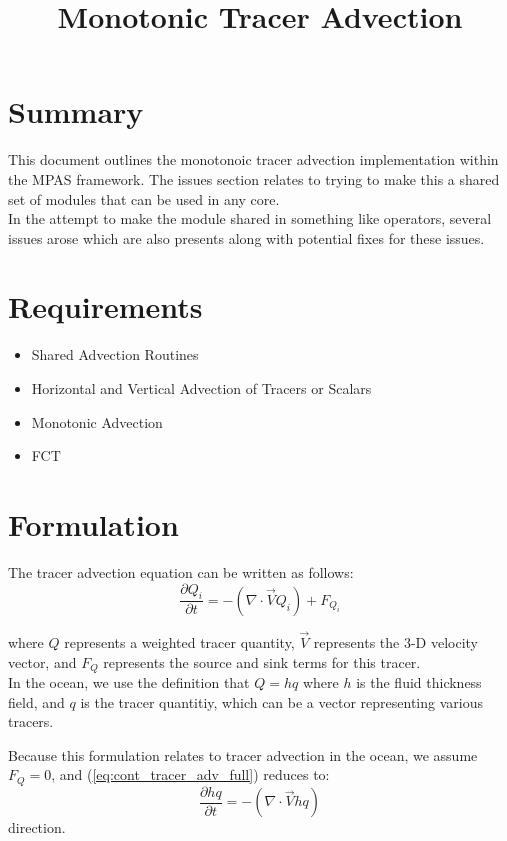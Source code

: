 \documentclass[11pt]{report}
\title{Monotonic Tracer Advection}
\begin{document}
\maketitle

\chapter{Summary}
This document outlines the monotonoic tracer advection implementation within
the MPAS framework. The issues section relates to trying to make this a shared
set of modules that can be used in any core. \\

In the attempt to make the module shared in something like operators, several
issues arose which are also presents along with potential fixes for these
issues.

\chapter{Requirements}

\begin{itemize}
	\item Shared Advection Routines
	\item Horizontal and Vertical Advection of Tracers or Scalars
	\item Monotonic Advection
	\item FCT
\end{itemize}
\chapter{Formulation}

The tracer advection equation can be written as follows:
\begin{equation}
	\frac{\partial Q_i}{\partial t} = - (\nabla \cdot \vec{V} Q_i) + F_{Q_i}
	\label{eq:cont_tracer_adv_full}
\end{equation}

where $Q$ represents a weighted tracer quantity, $\vec{V}$ represents the 3-D velocity
vector, and $F_{Q}$ represents the source and sink terms for this tracer. \\

In the ocean, we use the definition that ${Q} = h q$ where $h$ is the fluid
thickness field, and $q$ is the tracer quantitiy, which can be a vector representing various tracers.

Because this formulation relates to tracer advection in the ocean, we assume $F_{Q} = 0$, and (\ref{eq:cont_tracer_adv_full}) reduces to:
\begin{equation}
	\frac{\partial h q}{\partial t} = - (\nabla \cdot \vec{V} h q)
\end{equation}direction. \\
\end{document}
